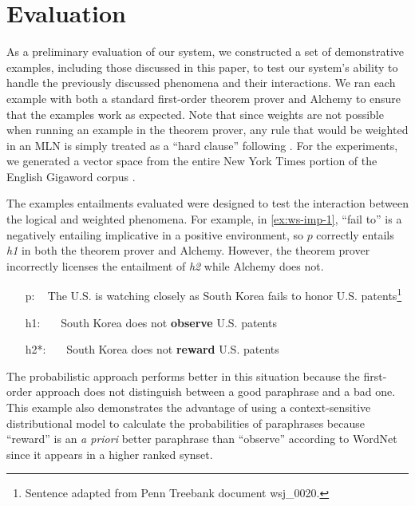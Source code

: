 \section{Evaluation}

As a preliminary evaluation of our system, we constructed a set of demonstrative
examples, including those discussed in this paper, to test our system's ability
to handle the previously discussed phenomena and their interactions.  We ran
each example with both a standard first-order theorem prover and Alchemy to
ensure that the examples work as expected. Note that since weights are not
possible when running an example in the theorem prover, any rule that would be
weighted in an MLN is simply treated as a ``hard clause'' following
\citet{bos:emnlp2005}.  For the experiments, we generated a vector space from
the entire New York Times portion of the English Gigaword corpus
\citep{graff:gigaword2003}.

The examples entailments evaluated were designed to test the interaction between
the logical and weighted phenomena.  For example, in \eqref{ex:ws-imp-1}, ``fail
to'' is a negatively entailing implicative in a positive environment, so $p$
correctly entails {\it h1} in both the theorem prover and Alchemy.
However, the theorem prover incorrectly licenses the entailment of {\it h2}
while Alchemy does not.
\begin{covex}\label{ex:ws-imp-1}
\begin{itemize}
  \item[p:]~    The U.S. is watching closely as South Korea fails to honor
  U.S. patents\footnote{Sentence adapted from Penn Treebank document wsj\_0020.}
  \item[h1:]~~~South Korea does not {\bf observe} U.S. patents
  \item[h2*:]~~~South Korea does not {\bf reward} U.S. patents
\end{itemize}
\end{covex}
The probabilistic approach performs better in this situation because the
first-order approach does not distinguish between a good paraphrase and a
bad one.  This example also demonstrates the advantage of using a
context-sensitive distributional model to calculate the probabilities of
paraphrases because ``reward'' is an {\it a priori} better paraphrase than
``observe'' according to WordNet since it appears in a higher ranked synset.

